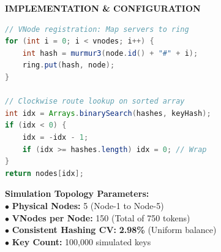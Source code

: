 \documentclass[12pt]{article}
\begin{document}
\hfill
\begin{minipage}[t]{0.48\textwidth}
    \vspace{0pt}
    {\fontsize{9.5}{11}\selectfont\color{shidenmuted}\textbf{IMPLEMENTATION \& CONFIGURATION}\par}
    \vspace{3.5mm}
    
    \begin{lstlisting}[language=Java]
// VNode registration: Map servers to ring
for (int i = 0; i < vnodes; i++) {
    int hash = murmur3(node.id() + "#" + i);
    ring.put(hash, node);
}

// Clockwise route lookup on sorted array
int idx = Arrays.binarySearch(hashes, keyHash);
if (idx < 0) {
    idx = -idx - 1;
    if (idx >= hashes.length) idx = 0; // Wrap
}
return nodes[idx];
    \end{lstlisting}
    
    \vspace{3.5mm}
    \fontsize{9.5}{12.5}\selectfont
    \noindent\textcolor{shidenaccent}{\textbf{Simulation Topology Parameters:}}\\
    \textcolor{shidenpurple}{$\bullet$ \textbf{Physical Nodes:}} 5 (Node-1 to Node-5)\\
    \textcolor{shidenpurple}{$\bullet$ \textbf{VNodes per Node:}} 150 (Total of 750 tokens)\\
    \textcolor{shidenpurple}{$\bullet$ \textbf{Consistent Hashing CV:}} \textbf{2.98\%} (Uniform balance)\\
    \textcolor{shidenpurple}{$\bullet$ \textbf{Key Count:}} 100,000 simulated keys
\end{minipage}
\clearpage
\end{document}
